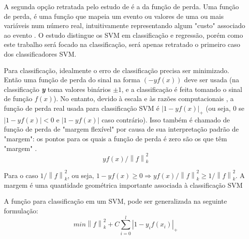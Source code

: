 A segunda opção retratada pelo estudo de  é a da função de perda. Uma função de perda, é uma função que mapeia um evento ou valores de uma ou mais variáveis num número real, intuitivamente representando algum "custo" associado ao evento \cite{wald1950statistical}. O estudo  distingue os SVM em classificação e regressão, porém como este trabalho será focado na classificação, será apenas retratado o primeiro caso dos classificadores SVM.

Para classificação, idealmente o erro de classificação precisa ser minimizado. Então uma função de perda do sinal na forma $ (-yf(x)) $ deve ser usada (na classificação \textbf{\textit{y}} toma valores binários $ \pm1 $, e a classificação é feita tomando o sinal de função $ f(x) $). No entanto, devido à escala e às razões computacionais \cite{vapnik1998statistical}, a função de perda real usada para classificação SVM é $ |1-yf(x)|_{+} $ (ou seja, 0 se $ |1-yf(x)|< 0 $ e $ |1-yf(x)| $ caso contrário). Isso também é chamado de função de perda de "margem flexível" por causa de sua interpretação padrão de "margem": os pontos para os quais a função de perda é zero são os que têm "margem" \cite{evgeniou1999support}.\[yf(x)/\left \| f \right \|_{k}^{2}\]

Para o caso $ 1/\left \| f \right \|_{k}^{2} $, ou seja, $1-yf(x) \geq  0 \Rightarrow yf(x)/\left \| f \right \|_{k}^{2} \geq 1/\left \| f \right \|_{k}^{2} $. A margem é uma quantidade geométrica importante associada à classificação SVM \cite{evgeniou1999support}

A função para classificação em um SVM, pode ser generalizada na seguinte formulação:
\[min\left \| f \right \|_{k}^{2}+C\sum_{i=0}^{l}\left | 1-y_{i}f(x_{i})\right |_{+}\]
